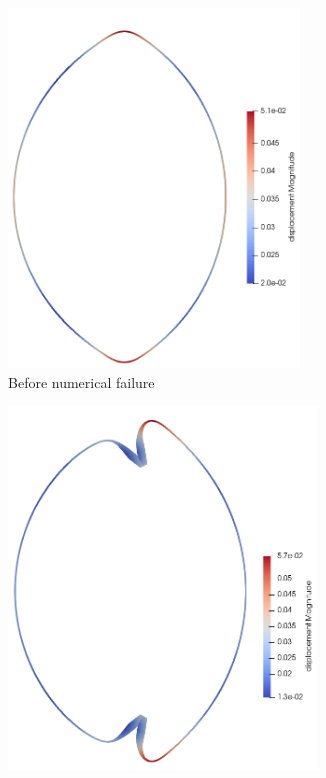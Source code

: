 \documentclass[11pt,a4paper,final]{article}
\begin{document}
\begin{figure}[h]
\centering
\begin{subfigure}{0.3\textwidth}
\centering
\includegraphics[width=0.85\textwidth]{instab_test_1_before_failure.png}
\caption{Before numerical failure}
\label{fig:3.16.1}
\end{subfigure}
\begin{subfigure}{0.3\textwidth}
\centering
\includegraphics[width=0.9\textwidth]{instab_test_1_membrane_inv_cells.png}

\end{subfigure}
\end{figure}
\end{document}
